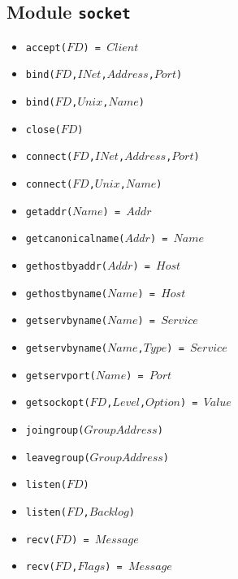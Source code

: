 \documentclass[10pt]{article}
\begin{document}
\begin{multicols}{2}
{\section*{Module \texttt{socket}}
\begin{scriptsize}
\begin{itemize}
    \item \texttt{accept($FD$) = $Client$}
    \item \texttt{bind($FD$,$INet$,$Address$,$Port$)}
    \item \texttt{bind($FD$,$Unix$,$Name$)}
    \item \texttt{close($FD$)}
    \item \texttt{connect($FD$,$INet$,$Address$,$Port$)}
    \item \texttt{connect($FD$,$Unix$,$Name$)}
    \item \texttt{getaddr($Name$) = $Addr$}
    \item \texttt{getcanonicalname($Addr$) = $Name$}
    \item \texttt{gethostbyaddr($Addr$) = $Host$}
    \item \texttt{gethostbyname($Name$) = $Host$}
    \item \texttt{getservbyname($Name$) = $Service$}
    \item \texttt{getservbyname($Name$,$Type$) = $Service$}
    \item \texttt{getservport($Name$) = $Port$}
    \item \texttt{getsockopt($FD$,$Level$,$Option$) = $Value$}
    \item \texttt{joingroup($GroupAddress$)}
    \item \texttt{leavegroup($GroupAddress$)}
    \item \texttt{listen($FD$)}
    \item \texttt{listen($FD$,$Backlog$)}
    \item \texttt{recv($FD$) = $Message$}
    \item \texttt{recv($FD$,$Flags$) = $Message$}

\end{itemize}
\end{scriptsize}}
\end{multicols}
\end{document}
